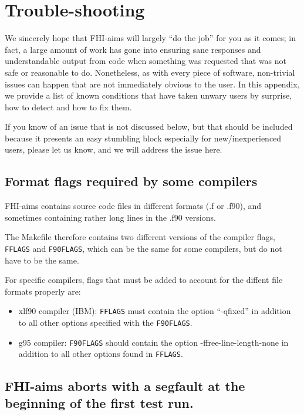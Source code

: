 \chapter{Trouble-shooting}
\label{appendix_trouble_shooting}

We sincerely hope that FHI-aims will largely ``do the job'' for you as
it comes; in fact, a large amount of work has gone into ensuring sane
responses and understandable output from code when something was
requested that was not safe or reasonable to do. Nonetheless, as with
every piece of software, non-trivial issues can happen that are not
immediately obvious to the user. In this appendix, we provide a list
of known conditions that have taken unwary users by surprise, how to
detect and how to fix them.

If you know of an issue that is not discussed below, but that should
be included because it presents an easy stumbling block especially for
new/inexperienced users, please let us know, and we will address the
issue here.

\section{Format flags required by some compilers}

FHI-aims contains source code files in different formats (.f or .f90),
and sometimes containing rather long lines in the .f90 versions.

The Makefile therefore contains two different versions of the compiler
flags, \texttt{FFLAGS} and \texttt{F90FLAGS}, which can be the same
for some compilers, but do not have to be the same.

For specific compilers, flags that must be added to account for the
diffent file formats properly are:
\begin{itemize}
  \item xlf90 compiler (IBM): \texttt{FFLAGS} must contain the option
    ``-qfixed'' in addition to all other options specified with the
    \texttt{F90FLAGS}.
  \item g95 compiler: \texttt{F90FLAGS} should contain the option
    -ffree-line-length-none in addition to all other options found in
    \texttt{FFLAGS}.
\end{itemize}

\section{FHI-aims aborts with a segfault at the beginning of the
  first test run.}

